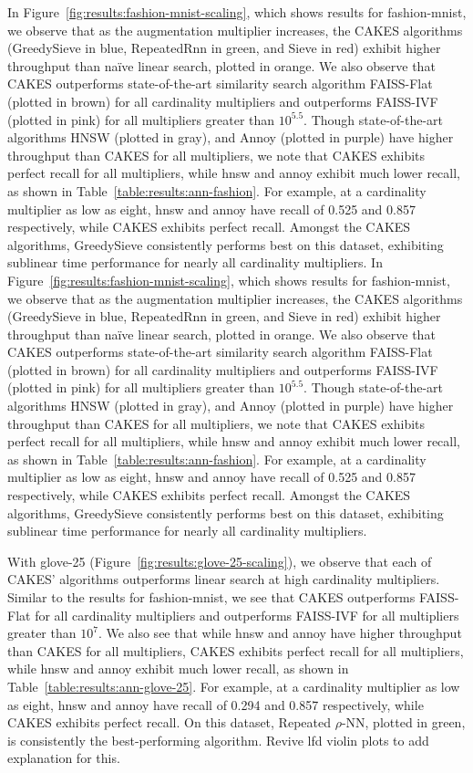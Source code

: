 In Figure~\ref{fig:results:fashion-mnist-scaling}, which shows results for fashion-mnist, we observe that as the augmentation multiplier increases, the CAKES algorithms (GreedySieve in blue, RepeatedRnn in green, and Sieve in red) exhibit higher throughput than na\"{i}ve linear search, plotted in orange. We also observe that CAKES outperforms state-of-the-art similarity search algorithm FAISS-Flat (plotted in brown) for all cardinality multipliers and outperforms FAISS-IVF (plotted in pink) for all multipliers greater than $10^{5.5}$. Though state-of-the-art algorithms HNSW (plotted in gray), and Annoy (plotted in purple) have higher throughput than CAKES for all multipliers, we note that CAKES exhibits perfect recall for all multipliers, while hnsw and annoy exhibit much lower recall, as shown in Table~\ref{table:results:ann-fashion}. For example, at a cardinality multiplier as low as eight, hnsw and annoy have recall of 0.525 and 0.857 respectively, while CAKES exhibits perfect recall.
Amongst the CAKES algorithms, GreedySieve consistently performs best on this dataset, exhibiting sublinear time performance for nearly all cardinality multipliers. 
In Figure~\ref{fig:results:fashion-mnist-scaling}, which shows results for fashion-mnist, we observe that as the augmentation multiplier increases, the CAKES algorithms (GreedySieve in blue, RepeatedRnn in green, and Sieve in red) exhibit higher throughput than na\"{i}ve linear search, plotted in orange. We also observe that CAKES outperforms state-of-the-art similarity search algorithm FAISS-Flat (plotted in brown) for all cardinality multipliers and outperforms FAISS-IVF (plotted in pink) for all multipliers greater than $10^{5.5}$. Though state-of-the-art algorithms HNSW (plotted in gray), and Annoy (plotted in purple) have higher throughput than CAKES for all multipliers, we note that CAKES exhibits perfect recall for all multipliers, while hnsw and annoy exhibit much lower recall, as shown in Table~\ref{table:results:ann-fashion}. For example, at a cardinality multiplier as low as eight, hnsw and annoy have recall of 0.525 and 0.857 respectively, while CAKES exhibits perfect recall.
Amongst the CAKES algorithms, GreedySieve consistently performs best on this dataset, exhibiting sublinear time performance for nearly all cardinality multipliers. 


With glove-25 (Figure~\ref{fig:results:glove-25-scaling}), we observe that each of CAKES' algorithms outperforms linear search at high cardinality multipliers. Similar to the results for fashion-mnist, we see that CAKES outperforms FAISS-Flat for all cardinality multipliers and outperforms FAISS-IVF for all multipliers greater than $10^{7}$. We also see that while hnsw and annoy have higher throughput than CAKES for all multipliers, CAKES exhibits perfect recall for all multipliers, while hnsw and annoy exhibit much lower recall, as shown in Table~\ref{table:results:ann-glove-25}. For example, at a cardinality multiplier as low as eight, hnsw and annoy have recall of 0.294 and 0.857 respectively, while CAKES exhibits perfect recall.
On this dataset, Repeated $\rho$-NN, plotted in green, is consistently the best-performing algorithm. {\color{red} Revive lfd violin plots to add explanation for this.}


